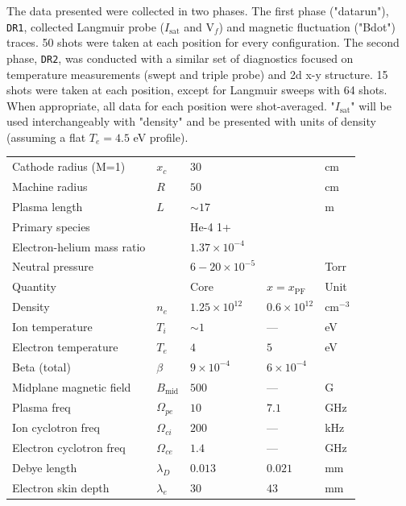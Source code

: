 The data presented were collected in two phases. The first phase ("datarun"), \texttt{DR1}, collected Langmuir probe ($I_\text{sat}$ and V$_f$) and magnetic fluctuation ("Bdot") \cite{Everson_design_2009} traces. 50 shots were taken at each position for every configuration. 
The second phase, \texttt{DR2}, was conducted with a similar set of diagnostics focused on temperature measurements (swept and triple probe) and 2d x-y structure. 15 shots were taken at each position, except for Langmuir sweeps with 64 shots. When appropriate, all data for each position were shot-averaged.
"$I_\text{sat}$" will be used interchangeably with "density" and be presented with units of density (assuming a flat $T_e = 4.5$ eV profile).

\begin{table}
    \centering
    \setlength\extrarowheight{-6pt}
    \begin{tabular}{l l l l l}
        Cathode radius (M=1) & $x_c$ & $30$ && cm \\
        Machine radius & $R$ & $50$ && cm \\
        Plasma length & $L$ & $\sim 17$ && m \\
        Primary species && He-4 1+ \\ 
        Electron-helium mass ratio && $1.37 \times 10^{-4}$ \\
        Neutral pressure && $6 - 20 \times 10^{-5}$ && Torr \\
        \hline
        Quantity &  & Core & $x=x_\text{PF}$ & Unit \\
        \hline
        Density & $n_e$ &  $1.25 \times 10^{12}$ & $ 0.6 \times 10^{12}$ & $\text{cm}^{-3}$ \\
        Ion temperature & $T_i$ & $\sim 1$ & — & eV \\
        Electron temperature & $T_e$ & $4$ & $5$ & eV \\
        Beta (total) & $\beta$ & $9 \times 10^{-4}$ & $6 \times 10^{-4}$ & \\
        Midplane magnetic field & $B_\text{mid}$ & $500$ & — & G \\
        Plasma freq & $\Omega_{pe}$ & $10$ & $7.1 $& GHz \\
        Ion cyclotron freq & $\Omega_{ci}$ & $200$ & — & kHz \\
        Electron cyclotron freq & $\Omega_{ce}$ & $1.4$ & — & GHz \\
        Debye length & $\lambda_D$ & $0.013$ & $0.021$ & mm \\
        Electron skin depth & $\lambda_{e}$ & $30$ & $43$ & mm\\

\end{tabular}
\end{table}
